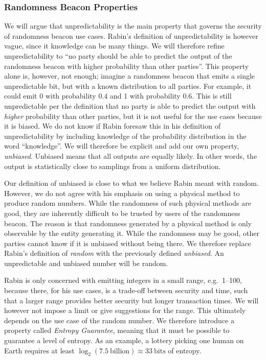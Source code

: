 \subsubsection{Randomness Beacon Properties}
We will argue that unpredictability is the main property that governs the security of randomness beacon use cases. Rabin's definition of unpredictability is however vague, since it knowledge can be many things. We will therefore refine unpredictability to \enquote{no party should be able to predict the output of the randomness beacon with higher probability than other parties}. This property alone is, however, not enough; imagine a randomness beacon that emits a single unpredictable bit, but with a known distribution to all parties. For example, it could emit 0 with probability $0.4$ and 1 with probability $0.6$. This is still unpredictable per the definition that no party is able to predict the output with \emph{higher} probability than other parties, but it is not useful for the use cases because it is biased. We do not know if Rabin foresaw this in his definition of unpredictability by including knowledge of the probability distribution in the word \enquote{knowledge}. We will therefore be explicit and add our own property, \emph{unbiased}. Unbiased means that all outputs are equally likely. In other words, the output is statistically close to samplings from a uniform distribution.

Our definition of unbiased is close to what we believe Rabin meant with random. However, we do not agree with his emphasis on using a physical method to produce random numbers. While the randomness of such physical methods are good, they are inherently difficult to be trusted by users of the randomness beacon. The reason is that randomness generated by a physical method is only observable by the entity generating it. While the randomness may be good, other parties cannot know if it is unbiased without being there. We therefore replace Rabin's definition of \emph{random} with the previously defined \emph{unbiased}. An unpredictable and unbiased number will be random.

Rabin is only concerned with emitting integers in a small range, e.g.\ 1--100, because there, for his use cases, is a trade-off between security and time, such that a larger range provides better security but longer transaction times. We will however not impose a limit or give suggestions for the range. This ultimately depends on the use case of the random number. We therefore introduce a property called \emph{Entropy Guarantee}, meaning that it must be possible to guarantee a level of entropy. As an example, a lottery picking one human on Earth requires at least $\log_2(7.5~\text{billion}) \approx 33~\text{bits}$ of entropy.

